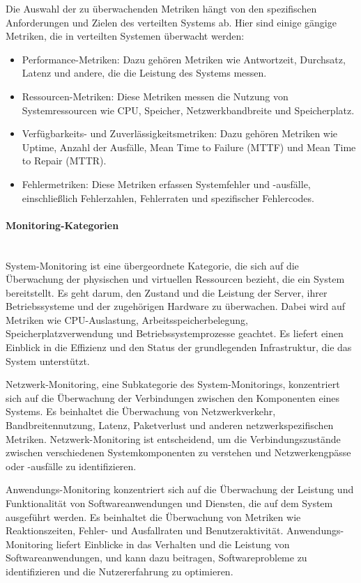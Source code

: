 Die Auswahl der zu überwachenden Metriken hängt von den spezifischen Anforderungen und Zielen des verteilten Systems ab. Hier sind einige gängige Metriken, die in verteilten Systemen überwacht werden:
\begin{itemize}
\item Performance-Metriken: Dazu gehören Metriken wie Antwortzeit, Durchsatz, Latenz und andere, die die Leistung des Systems messen.
\item Ressourcen-Metriken: Diese Metriken messen die Nutzung von Systemressourcen wie CPU, Speicher, Netzwerkbandbreite und Speicherplatz.
\item Verfügbarkeits- und Zuverlässigkeitsmetriken: Dazu gehören Metriken wie Uptime, Anzahl der Ausfälle, Mean Time to Failure (MTTF) und Mean Time to Repair (MTTR).
\item Fehlermetriken: Diese Metriken erfassen Systemfehler und -ausfälle, einschließlich Fehlerzahlen, Fehlerraten und spezifischer Fehlercodes.
\end{itemize}
\paragraph{Monitoring-Kategorien \\\\}
System-Monitoring ist eine übergeordnete Kategorie, die sich auf die Überwachung der physischen und virtuellen Ressourcen bezieht, die ein System bereitstellt. Es geht darum, den Zustand und die Leistung der Server, ihrer Betriebssysteme und der zugehörigen Hardware zu überwachen. Dabei wird auf Metriken wie CPU-Auslastung, Arbeitsspeicherbelegung, Speicherplatzverwendung und Betriebssystemprozesse geachtet. Es liefert einen Einblick in die Effizienz und den Status der grundlegenden Infrastruktur, die das System unterstützt.

Netzwerk-Monitoring, eine Subkategorie des System-Monitorings, konzentriert sich auf die Überwachung der Verbindungen zwischen den Komponenten eines Systems. Es beinhaltet die Überwachung von Netzwerkverkehr, Bandbreitennutzung, Latenz, Paketverlust und anderen netzwerkspezifischen Metriken. Netzwerk-Monitoring ist entscheidend, um die Verbindungszustände zwischen verschiedenen Systemkomponenten zu verstehen und Netzwerkengpässe oder -ausfälle zu identifizieren.

Anwendungs-Monitoring konzentriert sich auf die Überwachung der Leistung und Funktionalität von Softwareanwendungen und Diensten, die auf dem System ausgeführt werden. Es beinhaltet die Überwachung von Metriken wie Reaktionszeiten, Fehler- und Ausfallraten und Benutzeraktivität. Anwendungs-Monitoring liefert Einblicke in das Verhalten und die Leistung von Softwareanwendungen, und kann dazu beitragen, Softwareprobleme zu identifizieren und die Nutzererfahrung zu optimieren.

